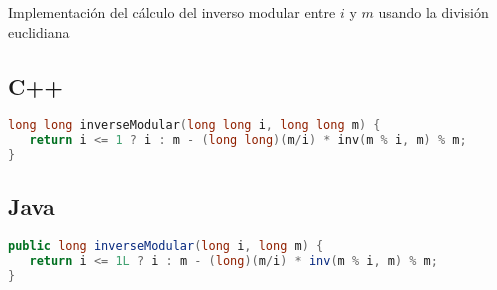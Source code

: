 Implementación del cálculo del inverso modular entre $i$ y $m$ usando la división euclidiana

\subsection{C++}

\begin{lstlisting}[language=C++]
long long inverseModular(long long i, long long m) {
   return i <= 1 ? i : m - (long long)(m/i) * inv(m % i, m) % m;
}
\end{lstlisting}

\subsection{Java}

\begin{lstlisting}[language=Java]
public long inverseModular(long i, long m) {
   return i <= 1L ? i : m - (long)(m/i) * inv(m % i, m) % m;
}
\end{lstlisting}